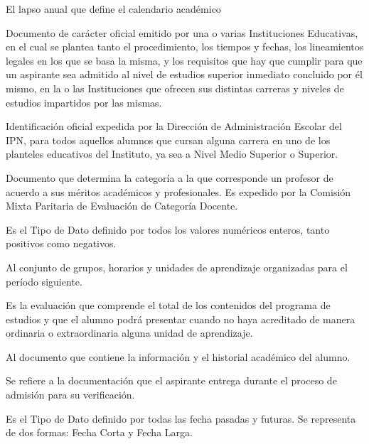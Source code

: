 \begin{bGlosario}
	 El lapso anual que define el calendario académico
	
	 Documento de carácter oficial emitido por una o varias Instituciones Educativas, en el cual se plantea tanto el procedimiento, los tiempos y fechas, los
	lineamientos legales en los que se basa la misma, y los requisitos que hay que cumplir para que un aspirante sea admitido al nivel de estudios superior inmediato concluido por él mismo, en la o las Instituciones que ofrecen sus distintas carreras y niveles de estudios impartidos por las mismas. %
	
	 Identificación oficial expedida por la Dirección de Administración Escolar del IPN, para todos aquellos alumnos que cursan alguna carrera en uno de los planteles educativos del Instituto, ya sea a Nivel Medio Superior o Superior. %
	
	 Documento que determina la categoría a la que corresponde un profesor de acuerdo a sus méritos académicos y profesionales. Es expedido por la  Comisión Mixta Paritaria de Evaluación de Categoría Docente. %
	
	
	 Es el Tipo de Dato definido por todos los valores numéricos enteros, tanto positivos como negativos.
	
	 Al conjunto de grupos, horarios y unidades de aprendizaje organizadas para el período siguiente.
	
	 Es la evaluación que comprende el total de los contenidos del programa de estudios y que el alumno podrá presentar cuando no haya acreditado de manera ordinaria o extraordinaria alguna unidad de aprendizaje.
	
	 Al documento que contiene la información y el historial académico del alumno.
	
	 Se refiere a la documentación que el aspirante entrega durante el proceso de admisión para su verificación. %
	
	 Es el Tipo de Dato definido por todas las fecha pasadas y futuras. Se representa de dos formas: Fecha Corta y Fecha Larga.
	

\end{bGlosario}
